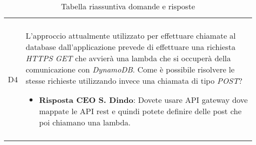 \begin{center}
\begin{longtable}{  p{2.5cm} p{11.7cm} }
\begin{itemize}
				\end{itemize}
				\\
				D4 & L'approccio attualmente utilizzato per effettuare chiamate al database dall'applicazione prevede di effettuare una richiesta \textit{HTTPS GET} che avvierà una lambda che si occuperà della comunicazione con \textit{DynamoDB}. Come è possibile risolvere le stesse richieste utilizzando invece una chiamata di tipo \textit{POST}?
				\begin{itemize}
					\item \textbf{Risposta CEO S. Dindo}: Dovete usare API gateway dove mappate le API rest e quindi potete definire delle post che poi chiamano una lambda. 
				\end{itemize}
				\\
				\rowcolor{white}
				\caption{Tabella riassuntiva domande e risposte}
			\end{longtable}	
		\end{center}
	
	
